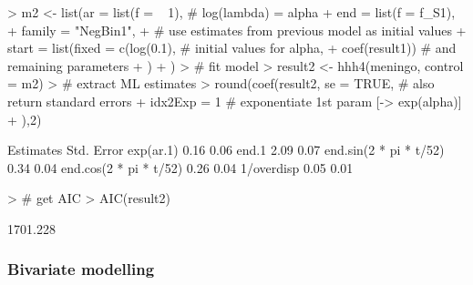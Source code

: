 \documentclass[a4paper,11pt]{article}
\begin{document}
\begin{Schunk}
\begin{Sinput}
> m2 <- list(ar = list(f = ~ 1),     # log(lambda) = alpha
+            end = list(f = f_S1), 
+            family = "NegBin1",
+            # use estimates from previous model as initial values
+            start = list(fixed = c(log(0.1),      # initial values for alpha, 
+                                   coef(result1)) # and remaining parameters
+                         )
+            )
> # fit model
> result2 <- hhh4(meningo, control = m2)
> # extract ML estimates
> round(coef(result2, se = TRUE,      # also return standard errors
+                     idx2Exp = 1     # exponentiate 1st param [-> exp(alpha)]
+                     ),2)
\end{Sinput}
\begin{Soutput}
                       Estimates Std. Error
exp(ar.1)                   0.16       0.06
end.1                       2.09       0.07
end.sin(2 * pi * t/52)      0.34       0.04
end.cos(2 * pi * t/52)      0.26       0.04
1/overdisp                  0.05       0.01
\end{Soutput}
\begin{Sinput}
> # get AIC
> AIC(result2)
\end{Sinput}
\begin{Soutput}
[1] 1701.228
\end{Soutput}
\end{Schunk}


\subsubsection{Bivariate modelling}
\end{document}
